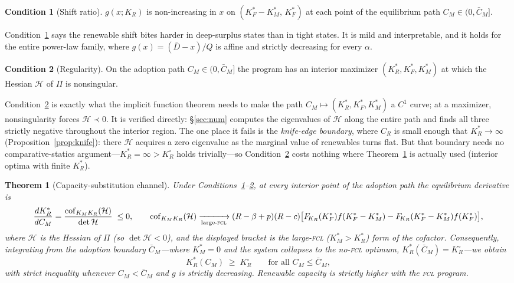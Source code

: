 \documentclass[11pt,reqno]{amsart}
\theoremstyle{plain}
\newtheorem{theorem}{Theorem}
\theoremstyle{definition}
\newtheorem{condition}{Condition}
\theoremstyle{remark}
\newcommand{\KR}{K_R}
\newcommand{\KM}{K_M}
\newcommand{\KRs}{K_R^{*}}
\newcommand{\KFs}{K_F^{*}}
\newcommand{\KMs}{K_M^{*}}
\newcommand{\KRo}{K_R^{\circ}}
\newcommand{\Dbar}{\bar D}
\newcommand{\CM}{C_M}
\newcommand{\CR}{C_R}
\newcommand{\CMbar}{\bar C_M}
\newcommand{\bp}{\beta+p}
\newcommand{\FKR}{F_{\!\KR}}
\begin{document}
\begin{condition}[Shift ratio]\label{cond:cs}
$g(x;\KR)$ is non-increasing in $x$ on $(\KFs-\KMs,\,\KFs)$ at each point of the
equilibrium path $\CM\in(0,\CMbar]$.
\end{condition}

Condition~\ref{cond:cs} says the renewable shift bites harder in deep-surplus
states than in tight states. It is mild and interpretable, and it holds for the
entire power-law family, where $g(x)=(\Dbar-x)/Q$ is affine and strictly
decreasing for every $\alpha$.

\begin{condition}[Regularity]\label{cond:reg}
On the adoption path $\CM\in(0,\CMbar]$ the program has an interior maximizer
$(\KRs,\KFs,\KMs)$ at which the Hessian $\mathcal H$ of $\Pi$ is nonsingular.
\end{condition}

\noindent Condition~\ref{cond:reg} is exactly what the implicit function theorem
needs to make the path $\CM\mapsto(\KRs,\KFs,\KMs)$ a $C^1$ curve; at a maximizer,
nonsingularity forces $\mathcal H\prec0$. It is verified directly:
\S\ref{sec:num} computes the eigenvalues of $\mathcal H$ along the entire path and
finds all three strictly negative throughout the interior region. The one place it
fails is the \emph{knife-edge boundary}, where $\CR$ is small enough that
$\KRs\!\to\!\infty$ (Proposition~\ref{prop:knife}): there $\mathcal H$ acquires a
zero eigenvalue as the marginal value of renewables turns flat. But that boundary
needs no comparative-statics argument---$\KRs=\infty>\KRo$ holds trivially---so
Condition~\ref{cond:reg} costs nothing where Theorem~\ref{thm:capacity} is actually
used (interior optima with finite $\KRs$).

\begin{theorem}[Capacity-substitution channel]\label{thm:capacity}
Under Conditions~\ref{cond:cs}--\ref{cond:reg}, at every interior point of the
adoption path the equilibrium derivative is
\begin{equation}\label{eq:dKRdCM}
  \frac{d\KRs}{d\CM}
  =\frac{\operatorname{cof}_{\KM\KR}(\mathcal H)}{\det\mathcal H}\;\le 0,
  \qquad
  \operatorname{cof}_{\KM\KR}(\mathcal H)\xrightarrow[\text{large-\textsc{fcl}}]{}
  (R-\bp)(R-c)\big[\FKR(\KFs)f(\KFs-\KMs)-\FKR(\KFs-\KMs)f(\KFs)\big],
\end{equation}
where $\mathcal H$ is the Hessian of $\Pi$ (so $\det\mathcal H<0$), and the
displayed bracket is the large-\textsc{fcl} ($\KMs>\KRs$) form of the cofactor.
Consequently, integrating from the adoption boundary $\CMbar$---where $\KMs=0$ and
the system collapses to the no-\textsc{fcl} optimum, $\KRs(\CMbar)=\KRo$---we
obtain
\begin{equation}
  \KRs(\CM)\;\ge\;\KRo\qquad\text{for all }\CM\le\CMbar,
\end{equation}
with strict inequality whenever $\CM<\CMbar$ and $g$ is strictly decreasing.
Renewable capacity is strictly higher with the \textsc{fcl} program.
\end{theorem}
\end{document}
